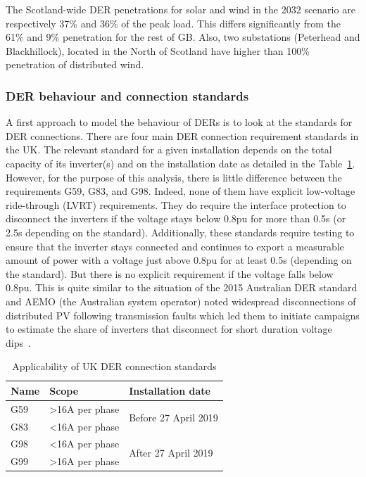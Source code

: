 The Scotland-wide DER penetrations for solar and wind in the 2032 scenario are respectively 37\% and 36\% of the peak load. This differs significantly from the 61\% and 9\% penetration for the rest of GB. Also, two substations (Peterhead and Blackhillock), located in the North of Scotland have higher than 100\% penetration of distributed wind.



\subsubsection{DER behaviour and connection standards}

A first approach to model the behaviour of DERs is to look at the standards for DER connections. There are four main DER connection requirement standards in the UK. The relevant standard for a given installation depends on the total capacity of its inverter(s) and on the installation date as detailed in the Table~\ref{tab:UK_standards}. However, for the purpose of this analysis, there is little difference between the requirements G59, G83, and G98. Indeed, none of them have explicit low-voltage ride-through (LVRT) requirements. They do require the interface protection to disconnect the inverters if the voltage stays below 0.8pu for more than 0.5s (or 2.5s depending on the standard).  Additionally, these standards require testing to ensure that the inverter stays connected and continues to export a measurable amount of power with a voltage just above 0.8pu for at least 0.5s (depending on the standard). But there is no explicit requirement if the voltage falls below 0.8pu. This is quite similar to the situation of the 2015 Australian DER standard and AEMO (the Australian system operator) noted widespread disconnections of distributed PV following transmission faults which led them to initiate campaigns to estimate the share of inverters that disconnect for short duration voltage dips~\cite{aemo_short_duration, aemo_behaviour_2021}.

\begin{table}
\centering
\caption{Applicability of UK DER connection standards}
\label{tab:UK_standards}
\begin{tabular}{@{}lll@{}}
\toprule
Name & Scope           & Installation date                     \\ \midrule
G59~\cite{G59}  & \textgreater 16A per phase & \multirow{2}{*}{Before 27 April 2019} \\
G83~\cite{G83}  & \textless 16A per phase &                                       \\
G98~\cite{G98}  & \textless 16A per phase & \multirow{2}{*}{After 27 April 2019}  \\
G99~\cite{G99}  & \textgreater 16A per phase &                                       \\ \bottomrule
\end{tabular}
\end{table}

